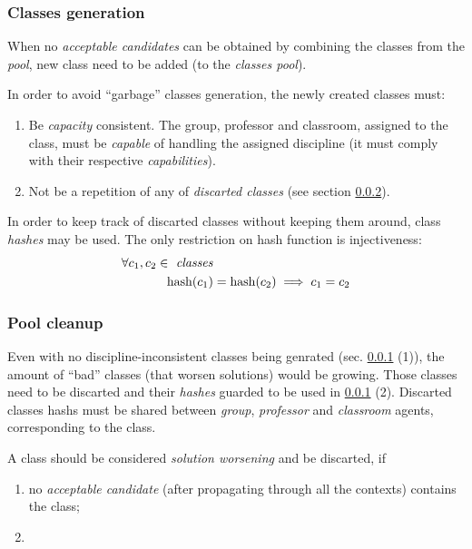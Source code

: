 \subsubsection{Classes generation}
\label{section:class-gen}
When no \emph{acceptable candidates} can be obtained by combining the classes
from the \emph{pool}, new class need to be added (to the \emph{classes pool}).

In order to avoid ``garbage'' classes generation, the newly created classes must:
\begin{enumerate}[(1)]
  \item Be \emph{capacity} consistent. The group, professor and classroom,
    assigned to the class, must be \emph{capable} of handling the assigned discipline
    (it must comply with their respective \emph{capabilities}).
  \item Not be a repetition of any of \emph{discarted classes}
    (see section \ref{section:clean-pool}).
\end{enumerate}

In order to keep track of discarted classes without keeping them around,
class \emph{hashes} may be used. The only restriction on hash function is
injectiveness:
\begin{align*}
  \forall c_1, c_2 \in \text{ \emph{classes}} & \\
  \mathrm{hash}(c_1) &= \mathrm{hash}(c_2) \implies c_1 = c_2
\end{align*}

\subsubsection{Pool cleanup}
\label{section:clean-pool}

Even with no discipline-inconsistent classes being genrated
(sec. \ref{section:class-gen} (1)), the amount of
``bad'' classes (that worsen solutions) would be growing.
Those classes need to be discarted and their \emph{hashes} guarded
to be used in \ref{section:class-gen} (2). Discarted classes hashs must be
shared between \emph{group}, \emph{professor} and \emph{classroom} agents,
corresponding to the class.

A class should be considered \emph{solution worsening} and be discarted, if
\begin{enumerate}
  \item no \emph{acceptable candidate} (after propagating through all the contexts)
    contains the class;
  \item {}
\end{enumerate}


